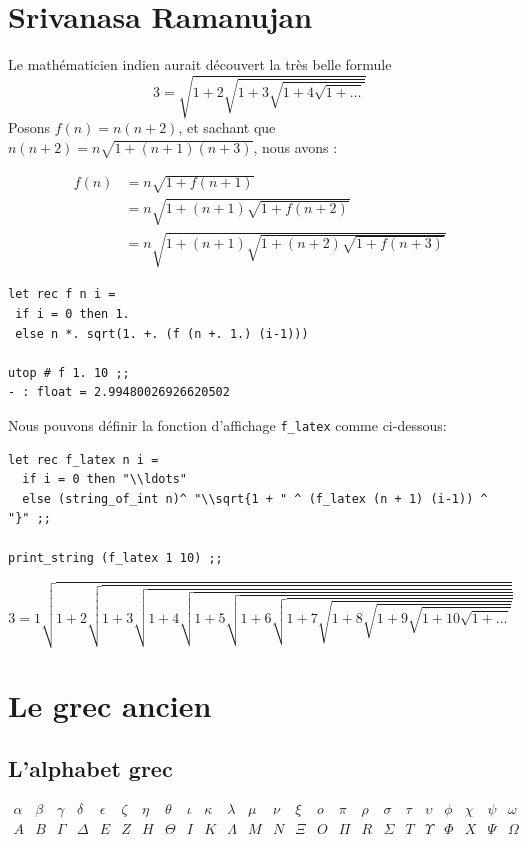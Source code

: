 \documentclass[11pt]{book}
\begin{document}
\section{Srivanasa Ramanujan}
Le mathématicien indien aurait  découvert la très belle formule 
$$ 3 = \sqrt{1+2\sqrt{1+3\sqrt{1+4\sqrt{1+\ldots}}}} $$
Posons $f(n) = n(n+2)$, et sachant que $n(n+2) = n \sqrt{1+(n+1)(n+3)}$, nous avons :

\begin{align*}
	f(n) &= n\sqrt{1+f(n+1)} \\
	 	 &= n\sqrt{1+(n+1)\sqrt{1+f(n+2)}} \\
	 	 &= n\sqrt{1+(n+1)\sqrt{1+(n+2)\sqrt{1+f(n+3)}}}
\end{align*}

\begin{Verbatim}
let rec f n i =
 if i = 0 then 1.
 else n *. sqrt(1. +. (f (n +. 1.) (i-1)))

utop # f 1. 10 ;;
- : float = 2.99480026926620502
\end{Verbatim}

Nous pouvons définir la fonction d'affichage \verb+f_latex+ comme ci-dessous:
\begin{Verbatim}
let rec f_latex n i =
  if i = 0 then "\\ldots"  
  else (string_of_int n)^ "\\sqrt{1 + " ^ (f_latex (n + 1) (i-1)) ^ "}" ;;

print_string (f_latex 1 10) ;;	
\end{Verbatim}
$$3 = 1\sqrt{1 + 2\sqrt{1 + 3\sqrt{1 + 4\sqrt{1 + 5\sqrt{1 + 6\sqrt{1 + 7\sqrt{1 + 8\sqrt{1 + 9\sqrt{1 + 10\sqrt{1 + \ldots}}}}}}}}}}
$$
\section{Le grec ancien}
\subsection{L'alphabet grec}
\[
\begin{array}{cccccccccccccccccccccccc}
 \alpha & \beta &\gamma &  \delta & \epsilon & \zeta & \eta &\theta & \iota &\kappa &\lambda & \mu & \nu & \xi & o & \pi & \rho & \sigma & \tau & 
 \upsilon & \phi & \chi & \psi & \omega \\
 A & B & \Gamma & \Delta & E & Z & H & \Theta & I & K & \Lambda & M & N  &\Xi & O & \Pi & R & \Sigma & T & \Upsilon & \Phi & X & \Psi & \Omega
 \end{array}
 \]
\end{document}
